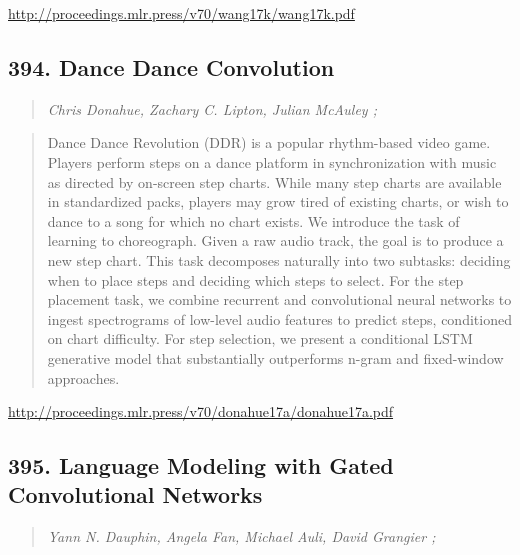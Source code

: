 \documentclass{article}
\begin{document}
\href{http://proceedings.mlr.press/v70/wang17k/wang17k.pdf}{http://proceedings.mlr.press/v70/wang17k/wang17k.pdf}

\subsection{394. Dance Dance Convolution}

\begin{quote}
\footnotesize{\textit{Chris Donahue, Zachary C. Lipton, Julian McAuley ;}}

\end{quote}

\begin{quote}
    Dance Dance Revolution (DDR) is a popular rhythm-based video game. Players perform steps on a dance platform in synchronization with music as directed by on-screen step charts. While many step charts are available in standardized packs, players may grow tired of existing charts, or wish to dance to a song for which no chart exists. We introduce the task of learning to choreograph. Given a raw audio track, the goal is to produce a new step chart. This task decomposes naturally into two subtasks: deciding when to place steps and deciding which steps to select. For the step placement task, we combine recurrent and convolutional neural networks to ingest spectrograms of low-level audio features to predict steps, conditioned on chart difficulty. For step selection, we present a conditional LSTM generative model that substantially outperforms n-gram and fixed-window approaches.  
\end{quote}

\href{http://proceedings.mlr.press/v70/donahue17a/donahue17a.pdf}{http://proceedings.mlr.press/v70/donahue17a/donahue17a.pdf}

\subsection{395. Language Modeling with Gated Convolutional Networks}

\begin{quote}
\footnotesize{\textit{Yann N. Dauphin, Angela Fan, Michael Auli, David Grangier ;}}

\end{quote}
\end{document}
